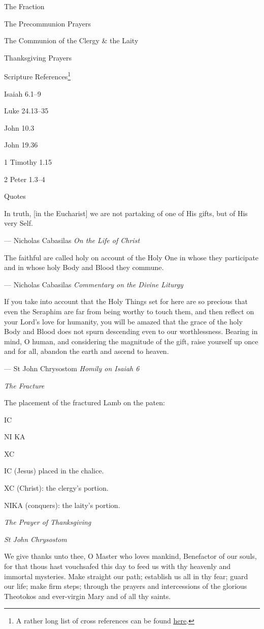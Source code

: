 \documentclass[
]{article}
\begin{document}
The Fraction

The Precommunion Prayers

The Communion of the Clergy \& the Laity

Thanksgiving Prayers

Scripture References\footnote{A rather long list of cross references can
  be found
  \href{http://jimmyakin.com/deuterocanonical-references-in-the-new-testament}{\ul{here}}.}

Isaiah 6.1--9

Luke 24.13--35

John 10.3

John 19.36

1 Timothy 1.15

2 Peter 1.3--4

Quotes

In truth, {[}in the Eucharist{]} we are not partaking of one of His
gifts, but of His very Self.

--- Nicholas Cabasilas \emph{On the Life of Christ}

The faithful are called holy on account of the Holy One in whose they
participate and in whose holy Body and Blood they commune.

--- Nicholas Cabasilas \emph{Commentary on the Divine Liturgy}

If you take into account that the Holy Things set for here are so
precious that even the Seraphim are far from being worthy to touch them,
and then reflect on your Lord's love for humanity, you will be amazed
that the grace of the holy Body and Blood does not spurn descending even
to our worthlessness. Bearing in mind, O human, and considering the
magnitude of the gift, raise yourself up once and for all, abandon the
earth and ascend to heaven.

--- St John Chrysostom \emph{Homily on Isaiah 6}

\emph{The Fracture}

The placement of the fractured Lamb on the paten:

IC

NI KA

XC

IC (Jesus) placed in the chalice.

XC (Christ): the clergy's portion.

NIKA (conquers): the laity's portion.

\emph{The Prayer of Thanksgiving}

\emph{St John Chrysostom}

We give thanks unto thee, O Master who loves mankind, Benefactor of our
souls, for that thous hast vouchsafed this day to feed us with thy
heavenly and immortal mysteries. Make straight our path; establish us
all in thy fear; guard our life; make firm steps; through the prayers
and intercessions of the glorious Theotokos and ever-virgin Mary and of
all thy saints.
\end{document}
